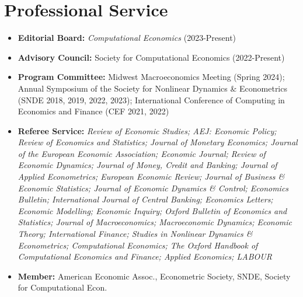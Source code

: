 \documentclass[10pt,letterpaper,en-US]{article}
\begin{document}
\section*{Professional Service}
\begin{itemize}
\item \textbf{Editorial Board:} \emph{Computational Economics} (2023-Present)
\item \textbf{Advisory Council:} Society for Computational Economics (2022-Present)
\item \textbf{Program Committee:} Midwest Macroeconomics Meeting (Spring 2024); Annual Symposium of the Society for Nonlinear Dynamics \& Econometrics (SNDE 2018, 2019, 2022, 2023); International Conference of Computing in Economics and Finance (CEF 2021, 2022)
\item \textbf{Referee Service:} \emph{Review of Economic Studies; AEJ: Economic Policy; Review of Economics and Statistics; Journal of Monetary Economics; Journal of the European Economic Association; Economic Journal; Review of Economic Dynamics; Journal of Money, Credit and Banking; Journal of Applied Econometrics; European Economic Review; Journal of Business \& Economic Statistics; Journal of Economic Dynamics \& Control; Economics Bulletin; International Journal of Central Banking; Economics Letters; Economic Modelling; Economic Inquiry; Oxford Bulletin of Economics and Statistics; Journal of Macroeconomics; Macroeconomic Dynamics; Economic Theory; International Finance; Studies in Nonlinear Dynamics \& Econometrics; Computational Economics; The Oxford Handbook of Computational Economics and Finance; Applied Economics; LABOUR}
\item \textbf{Member:} American Economic Assoc., Econometric Society, SNDE, Society for Computational Econ.
\end{itemize}
\end{document}
